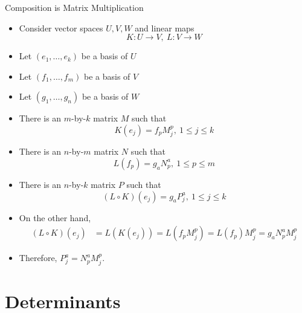 \documentclass[usenames,dvipsnames,10pt]{beamer}
\begin{document}
\begin{frame}
  {Composition is Matrix Multiplication}

  \begin{itemize}
  \item Consider vector spaces $U, V, W$ and linear maps
    \[
      K: U \rightarrow V,\ L: V \rightarrow W
    \]
  \item Let $(e_1, \dots, e_k)$ be a basis of $U$
  \item Let $(f_1, \dots, f_m)$ be a basis of $V$
  \item Let $(g_1, \dots, g_n)$ be a basis of $W$
  \item There is an $m$-by-$k$ matrix $M$ such that
    \[
      K(e_j) = f_pM^p_j,\ 1 \le j \le k
    \]
  \item There is an $n$-by-$m$ matrix $N$ such that
    \[
      L(f_p) = g_aN^a_p,\ 1 \le p \le m
    \]
  \item There is an $n$-by-$k$ matrix $P$ such that
    \[
      (L\circ K)(e_j) = g_aP^a_j,\ 1 \le j \le k
    \]
  \item On the other hand,
    \begin{align*}
      (L\circ K)(e_j) &= L(K(e_j)) = L(f_pM^p_j) = L(f_p)M^p_j = g_aN^a_pM^p_j
    \end{align*}
  \item Therefore, $P^a_j = N^a_pM^p_j$.
  \end{itemize}
\end{frame}

\section{Determinants}
\end{document}
